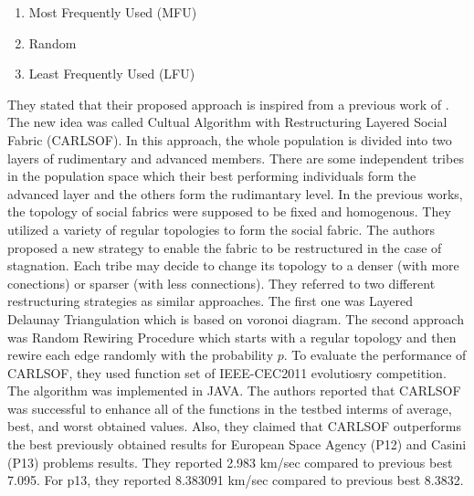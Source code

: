 \begin{enumerate}
	\item Most Frequently Used (MFU)
	\item Random
	\item Least Frequently Used (LFU)
\end{enumerate}
They stated that their proposed approach is inspired from a previous work of \citet{reynolds2008mining}. The new idea was called Cultual Algorithm with Restructuring Layered Social Fabric (CARLSOF). In this approach, the whole population is divided into two layers of rudimentary and advanced members. There are some independent tribes in the population space which their best performing individuals form the advanced layer and the others form the rudimantary level. In the previous works, the topology of social fabrics were supposed to be fixed and homogenous. They utilized a variety of regular topologies to form the social fabric. The authors proposed a new strategy to enable the fabric to be restructured in the case of stagnation. Each tribe may decide to change its topology to a denser (with more conections) or sparser (with less connections). They referred to two different restructuring strategies as similar approaches. The first one was Layered Delaunay Triangulation which is based on voronoi diagram. The second approach was Random Rewiring Procedure which starts with a regular topology and then rewire each edge randomly with the probability $p$. \newline
To evaluate the performance of CARLSOF, they used function set of IEEE-CEC2011 evolutiosry competition. The algorithm was implemented in JAVA. The authors reported that CARLSOF was successful to enhance all of the functions in the testbed interms of average, best, and worst obtained values. Also, they claimed that CARLSOF outperforms the best previously obtained results for European Space Agency (P12) and Casini (P13) problems results. They reported 2.983 km/sec compared to previous best 7.095. For p13, they reported 8.383091 km/sec compared to previous best 8.3832.

